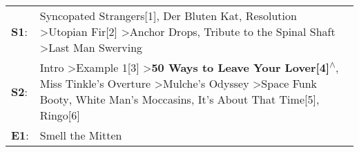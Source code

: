 \begin{supertabular}{p{0.03\textwidth}p{0.92\textwidth}}
 \textbf{S1}:  &                                                                                                                             Syncopated Strangers[1]\textsuperscript{}, \enspace Der Bluten Kat\textsuperscript{}, \enspace Resolution\textsuperscript{} \textgreater \enspace Utopian Fir[2]\textsuperscript{} \textgreater \enspace Anchor Drops\textsuperscript{}, \enspace Tribute to the Spinal Shaft\textsuperscript{} \textgreater \enspace Last Man Swerving\textsuperscript{}  \enspace  \\
 \textbf{S2}:  &  Intro\textsuperscript{} \textgreater \enspace Example 1[3]\textsuperscript{} \textgreater \enspace \textbf{50 Ways to Leave Your Lover[4]\textsuperscript{$\wedge$}}, \enspace Miss Tinkle's Overture\textsuperscript{} \textgreater \enspace Mulche's Odyssey\textsuperscript{} \textgreater \enspace Space Funk Booty\textsuperscript{}, \enspace White Man's Moccasins\textsuperscript{}, \enspace It's About That Time[5]\textsuperscript{}, \enspace Ringo[6]\textsuperscript{}  \enspace  \\
 \textbf{E1}:  &                                                                                                                                                                                                                                                                                                                                                                                                                                                    Smell the Mitten\textsuperscript{}  \enspace  \\
\end{supertabular}
